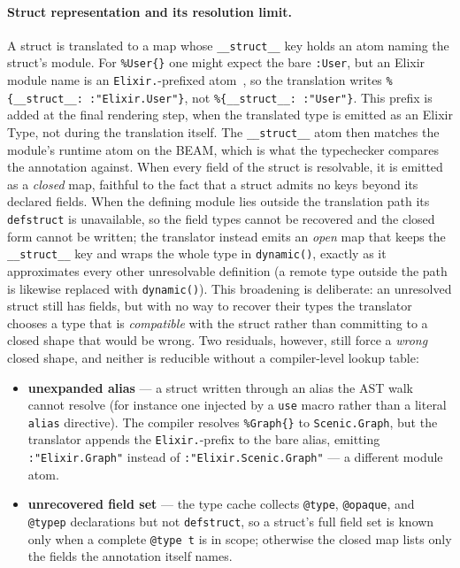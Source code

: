 \paragraph{Struct representation and its resolution limit.}
\label{sec:struct-representation}
A struct is translated to a map whose \texttt{\_\_struct\_\_} key holds an atom naming the struct's module.
For \texttt{\%User\{\}} one might expect the bare \texttt{:User}, but an Elixir module name is an \texttt{Elixir.}-prefixed atom~\cite{elixir-modules-atoms}, so the translation writes \texttt{\%\{\_\_struct\_\_: :"Elixir.User"\}}, not \texttt{\%\{\_\_struct\_\_: :"User"\}}.
This prefix is added at the final rendering step, when the translated type is emitted as an Elixir Type, not during the translation itself. The \texttt{\_\_struct\_\_} atom then matches the module's runtime atom on the BEAM, which is what the typechecker compares the annotation against.
When every field of the struct is resolvable, it is emitted as a \emph{closed} map, faithful to the fact that a struct admits no keys beyond its declared fields.
When the defining module lies outside the translation path its \texttt{defstruct} is unavailable, so the field types cannot be recovered and the closed form cannot be written; the translator instead emits an \emph{open} map that keeps the \texttt{\_\_struct\_\_} key and wraps the whole type in \texttt{dynamic()}, exactly as it approximates every other unresolvable definition (a remote type outside the path is likewise replaced with \texttt{dynamic()}).
This broadening is deliberate: an unresolved struct still has fields, but with no way to recover their types the translator chooses a type that is \emph{compatible} with the struct rather than committing to a closed shape that would be wrong.
Two residuals, however, still force a \emph{wrong} closed shape, and neither is reducible without a compiler-level lookup table:
\begin{itemize}
    \item \textbf{unexpanded alias} --- a struct written through an alias the AST walk cannot resolve (for instance one injected by a \texttt{use} macro rather than a literal \texttt{alias} directive). The compiler resolves \texttt{\%Graph\{\}} to \texttt{Scenic.Graph}, but the translator appends the \texttt{Elixir.}-prefix to the bare alias, emitting \texttt{:"Elixir.Graph"} instead of \texttt{:"Elixir.Scenic.Graph"} --- a different module atom.
    \item \textbf{unrecovered field set} --- the type cache collects \texttt{@type}, \texttt{@opaque}, and \texttt{@typep} declarations but not \texttt{defstruct}, so a struct's full field set is known only when a complete \texttt{@type t} is in scope; otherwise the closed map lists only the fields the annotation itself names.
\end{itemize}
